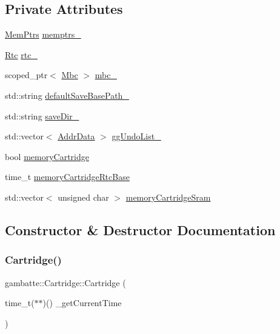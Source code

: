 \subsection*{Private Attributes}
\begin{DoxyCompactItemize}
\item 
\hyperlink{classgambatte_1_1MemPtrs}{Mem\+Ptrs} \hyperlink{classgambatte_1_1Cartridge_ae4e6c2c7556a809cb6719f73fe256643}{memptrs\+\_\+}
\item 
\hyperlink{classgambatte_1_1Rtc}{Rtc} \hyperlink{classgambatte_1_1Cartridge_a32947bf947f84c9f98c30a1b413e91e6}{rtc\+\_\+}
\item 
scoped\+\_\+ptr$<$ \hyperlink{classgambatte_1_1Mbc}{Mbc} $>$ \hyperlink{classgambatte_1_1Cartridge_a94785054569a9ea1df0d3c9cea074ef8}{mbc\+\_\+}
\item 
std\+::string \hyperlink{classgambatte_1_1Cartridge_af35601276a25e69bb84f54bc864daeed}{default\+Save\+Base\+Path\+\_\+}
\item 
std\+::string \hyperlink{classgambatte_1_1Cartridge_a06acb91d23c878135eb7e8aefcc6de5f}{save\+Dir\+\_\+}
\item 
std\+::vector$<$ \hyperlink{structgambatte_1_1Cartridge_1_1AddrData}{Addr\+Data} $>$ \hyperlink{classgambatte_1_1Cartridge_a13d6eb2e426588bcf1e34f3b83c1b219}{gg\+Undo\+List\+\_\+}
\item 
bool \hyperlink{classgambatte_1_1Cartridge_a47d15c2e350647b805b299c73513451b}{memory\+Cartridge}
\item 
time\+\_\+t \hyperlink{classgambatte_1_1Cartridge_a81cec8cae288cc425bd90ff556536630}{memory\+Cartridge\+Rtc\+Base}
\item 
std\+::vector$<$ unsigned char $>$ \hyperlink{classgambatte_1_1Cartridge_a78010ede72a9fd7d82b4817a98df67cc}{memory\+Cartridge\+Sram}
\end{DoxyCompactItemize}


\subsection{Constructor \& Destructor Documentation}
\mbox{\label{classgambatte_1_1Cartridge_a02a7810564cf878e8a669b36818f760b}} 
\subsubsection{\texorpdfstring{Cartridge()}{Cartridge()}}
{\footnotesize\ttfamily gambatte\+::\+Cartridge\+::\+Cartridge (\begin{DoxyParamCaption}\item[{time\+\_\+t($\ast$$\ast$)()}]{\+\_\+get\+Current\+Time }\end{DoxyParamCaption})}



